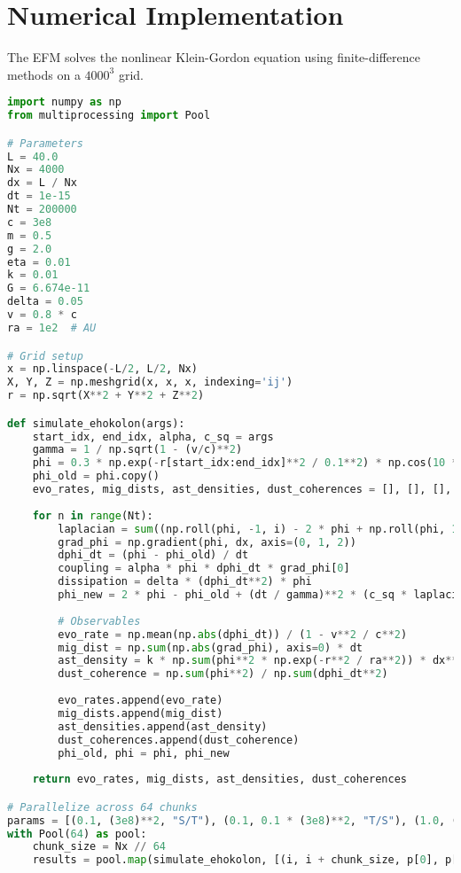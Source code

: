 \documentclass[11pt]{article}
\begin{document}
\section{Numerical Implementation}
The EFM solves the nonlinear Klein-Gordon equation using finite-difference methods on a \(4000^3\) grid.

\begin{lstlisting}[language=Python, caption={Fluxonic Solar System Simulation}, label=lst:simulation]
import numpy as np
from multiprocessing import Pool

# Parameters
L = 40.0
Nx = 4000
dx = L / Nx
dt = 1e-15
Nt = 200000
c = 3e8
m = 0.5
g = 2.0
eta = 0.01
k = 0.01
G = 6.674e-11
delta = 0.05
v = 0.8 * c
ra = 1e2  # AU

# Grid setup
x = np.linspace(-L/2, L/2, Nx)
X, Y, Z = np.meshgrid(x, x, x, indexing='ij')
r = np.sqrt(X**2 + Y**2 + Z**2)

def simulate_ehokolon(args):
    start_idx, end_idx, alpha, c_sq = args
    gamma = 1 / np.sqrt(1 - (v/c)**2)
    phi = 0.3 * np.exp(-r[start_idx:end_idx]**2 / 0.1**2) * np.cos(10 * X[start_idx:end_idx]) + 0.1 * np.random.rand(Nx//64, Nx, Nx)
    phi_old = phi.copy()
    evo_rates, mig_dists, ast_densities, dust_coherences = [], [], [], []
    
    for n in range(Nt):
        laplacian = sum((np.roll(phi, -1, i) - 2 * phi + np.roll(phi, 1, i)) / dx**2 for i in range(3))
        grad_phi = np.gradient(phi, dx, axis=(0, 1, 2))
        dphi_dt = (phi - phi_old) / dt
        coupling = alpha * phi * dphi_dt * grad_phi[0]
        dissipation = delta * (dphi_dt**2) * phi
        phi_new = 2 * phi - phi_old + (dt / gamma)**2 * (c_sq * laplacian - m**2 * phi - g * phi**3 - eta * phi**5 + coupling - dissipation)
        
        # Observables
        evo_rate = np.mean(np.abs(dphi_dt)) / (1 - v**2 / c**2)
        mig_dist = np.sum(np.abs(grad_phi), axis=0) * dt
        ast_density = k * np.sum(phi**2 * np.exp(-r**2 / ra**2)) * dx**3
        dust_coherence = np.sum(phi**2) / np.sum(dphi_dt**2)
        
        evo_rates.append(evo_rate)
        mig_dists.append(mig_dist)
        ast_densities.append(ast_density)
        dust_coherences.append(dust_coherence)
        phi_old, phi = phi, phi_new
    
    return evo_rates, mig_dists, ast_densities, dust_coherences

# Parallelize across 64 chunks
params = [(0.1, (3e8)**2, "S/T"), (0.1, 0.1 * (3e8)**2, "T/S"), (1.0, (3e8)**2, "S=T")]
with Pool(64) as pool:
    chunk_size = Nx // 64
    results = pool.map(simulate_ehokolon, [(i, i + chunk_size, p[0], p[1]) for i in range(0, Nx, chunk_size) for p in params])
\end{lstlisting}
\end{document}
